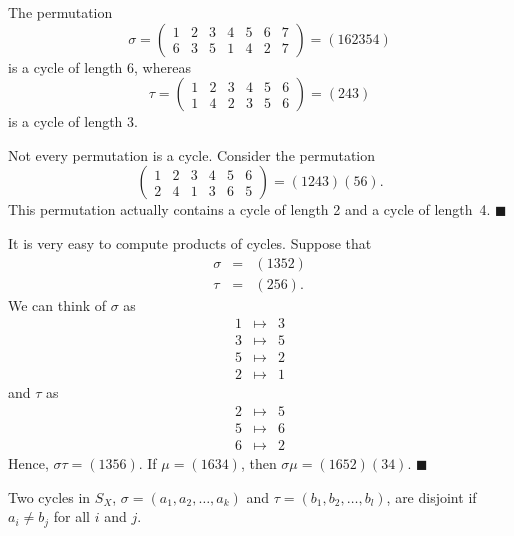  
The permutation
$$
\sigma =
\left(
\begin{array}{ccccccc}
1 & 2 & 3 & 4 & 5 & 6 & 7\\
6 & 3 & 5 & 1 & 4 & 2 & 7
\end{array}
\right)
=
(1 6 2 3 5 4 )
$$
is a cycle of length 6, whereas
$$
\tau =
\left(
\begin{array}{cccccc}
1 & 2 & 3 & 4 & 5 & 6 \\
1 & 4 & 2 & 3 & 5 & 6
\end{array}
\right)
=
(2 4 3)
$$
is a cycle of length 3.
 
 
Not every permutation is a cycle. Consider the permutation
$$
\left(
\begin{array}{cccccc}
1 & 2 & 3 & 4 & 5 & 6 \\
2 & 4 & 1 & 3 & 6 & 5
\end{array}
\right) = (1 2 4 3)(5 6).
$$
This permutation actually contains a cycle of length 2 and a cycle
of length~4. 
\mbox{\hspace{1in}}
\hspace{\fill} $\blacksquare$
 
 
\vspace{2ex}
 
 
It is very easy to compute products of cycles. Suppose that
\begin{eqnarray*}
\sigma & = & (1 3 5 2 ) \\
\tau   & = & (2 5 6).
\end{eqnarray*}
We can think of $\sigma$ as
\begin{eqnarray*}
1 & \mapsto & 3 \\
3 & \mapsto & 5 \\
5 & \mapsto & 2 \\
2 & \mapsto & 1
\end{eqnarray*}
and $\tau$ as
\begin{eqnarray*}
2 & \mapsto & 5 \\
5 & \mapsto & 6 \\
6 & \mapsto & 2
\end{eqnarray*}
Hence, $\sigma \tau =  (1 3 5 6 )$.
If $\mu = (1634)$, then $\sigma \mu = (1 6 5 2)(3 4)$.
\hspace{\fill} $\blacksquare$
 
 
\vspace{2ex}
 
 
Two cycles in $S_X$, $\sigma = (a_1, a_2, \ldots, a_k )$ and $\tau =
(b_1, b_2, \ldots, b_l )$, are {\bfi disjoint}
if $a_i \neq b_j$ for all $i$ and $j$. 
 
